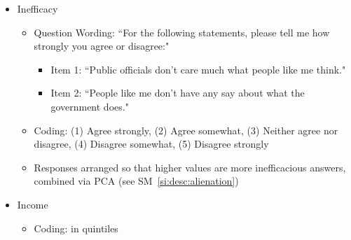 \begin{itemize}
	\item Inefficacy
	\begin{itemize}
		\item Question Wording: ``For the following statements, please tell me how strongly you agree or disagree:"
		\begin{itemize} 
			\item Item 1: ``Public officials don't care much what people like me think."
			\item Item 2: ``People like me don't have any say about what the government does."
		\end{itemize}
		\item Coding: (1) Agree strongly, (2) Agree somewhat, (3) Neither agree nor disagree, (4) Disagree somewhat, (5) Disagree strongly
		\item Responses arranged so that higher values are more inefficacious answers, combined via PCA (see SM~\ref{si:desc:alienation})
	\end{itemize}
		
	\item Income
		\begin{itemize}
			\item Coding: in quintiles
		\end{itemize}
		

\end{itemize}
